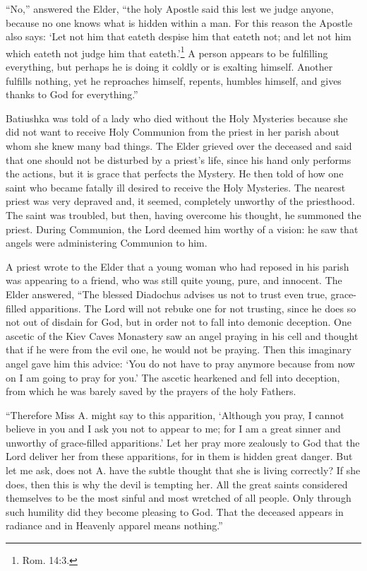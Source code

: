 ``No,'' answered the Elder, ``the holy Apostle said this lest we judge anyone, because no one knows what is hidden within a man. For this reason the Apostle also says: `Let not him that eateth despise him that eateth not; and let not him which eateth not judge him that eateth.'\footnote{Rom. 14:3.} A person appears to be fulfilling everything, but perhaps he is doing it coldly or is exalting himself. Another fulfills nothing, yet he reproaches himself, repents, humbles himself, and gives thanks to God for everything.''

Batiushka was told of a lady who died without the Holy Mysteries because she did not want to receive Holy Communion from the priest in her parish about whom she knew many bad things. The Elder grieved over the deceased and said that one should not be disturbed by a priest's life, since his hand only performs the actions, but it is grace that perfects the Mystery. He then told of how one saint who became fatally ill desired to receive the Holy Mysteries. The nearest priest was very depraved and, it seemed, completely unworthy of the priesthood. The saint was troubled, but then, having overcome his thought, he summoned the priest. During Communion, the Lord deemed him worthy of a vision: he saw that angels were administering Communion to him.

A priest wrote to the Elder that a young woman who had reposed in his parish was appearing to a friend, who was still quite young, pure, and innocent. The Elder answered, ``The blessed Diadochus advises us not to trust even true, grace-filled apparitions. The Lord will not rebuke one for not trusting, since he does so not out of disdain for God, but in order not to fall into demonic deception. One ascetic of the Kiev Caves Monastery saw an angel praying in his cell and thought that if he were from the evil one, he would not be praying. Then this imaginary angel gave him this advice: `You do not have to pray anymore because from now on I am going to pray for you.' The ascetic hearkened and fell into deception, from which he was barely saved by the prayers of the holy Fathers.

``Therefore Miss A. might say to this apparition, `Although you pray, I cannot believe in you and I ask you not to appear to me; for I am a great sinner and unworthy of grace-filled apparitions.' Let her pray more zealously to God that the Lord deliver her from these apparitions, for in them is hidden great danger. But let me ask, does not A. have the subtle thought that she is living correctly? If she does, then this is why the devil is tempting her. All the great saints considered themselves to be the most sinful and most wretched of all people. Only through such humility did they become pleasing to God. That the deceased appears in radiance and in Heavenly apparel means nothing.''

